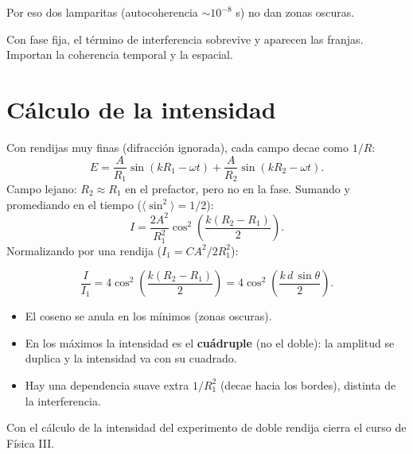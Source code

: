 \documentclass[12pt,a4paper]{article}
\begin{document}
Por eso dos lamparitas (autocoherencia $\sim 10^{-8}$ s) no dan zonas oscuras.

\begin{notebox}[Coherente]
  Con fase fija, el término de interferencia sobrevive y aparecen las franjas.
  Importan la coherencia temporal y la espacial.
\end{notebox}

\section{Cálculo de la intensidad}

Con rendijas muy finas (difracción ignorada), cada campo decae como $1/R$:
\[
E = \frac{A}{R_1}\sin(kR_1 - \omega t) + \frac{A}{R_2}\sin(kR_2 - \omega t).
\]
Campo lejano: $R_2 \approx R_1$ en el prefactor, pero no en la fase. Sumando y
promediando en el tiempo ($\langle\sin^2\rangle = 1/2$):
\[
I = \frac{2A^2}{R_1^2}\cos^2\!\left(\frac{k(R_2-R_1)}{2}\right).
\]
Normalizando por una rendija ($I_1 = CA^2/2R_1^2$):

\begin{keybox}
  \[
  \boxed{\frac{I}{I_1} = 4\cos^2\!\left(\frac{k(R_2 - R_1)}{2}\right)}
  = 4\cos^2\!\left(\frac{k\,d\,\sin\theta}{2}\right).
  \]
\end{keybox}

\begin{itemize}[nosep]
  \item El coseno se anula en los mínimos (zonas oscuras).
  \item En los máximos la intensidad es el \textbf{cuádruple} (no el doble): la
        amplitud se duplica y la intensidad va con su cuadrado.
  \item Hay una dependencia suave extra $1/R_1^2$ (decae hacia los bordes),
        distinta de la interferencia.
\end{itemize}



\begin{notebox}
  Con el cálculo de la intensidad del experimento de doble rendija cierra el
  curso de Física III.
\end{notebox}
\end{document}
